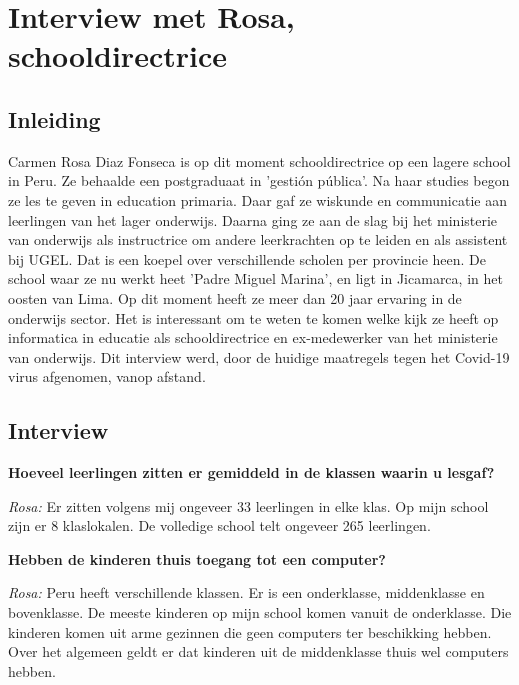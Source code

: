 
\chapter{Interview met Rosa, schooldirectrice}
\label{ch:interviewRosa}

\section{Inleiding}
Carmen Rosa Diaz Fonseca is op dit moment schooldirectrice op een lagere school in Peru. Ze behaalde een postgraduaat in 'gestión pública'. Na haar studies begon ze les te geven in education primaria. Daar gaf ze wiskunde en communicatie aan leerlingen van het lager onderwijs. Daarna ging ze aan de slag bij het ministerie van onderwijs als instructrice om andere leerkrachten op te leiden en als assistent bij UGEL. Dat is een koepel over verschillende scholen per provincie heen. De school waar ze nu werkt heet 'Padre Miguel Marina', en ligt in Jicamarca, in het oosten van Lima. Op dit moment heeft ze meer dan 20 jaar ervaring in de onderwijs sector. Het is interessant om te weten te komen welke kijk ze heeft op informatica in educatie als schooldirectrice en ex-medewerker van het ministerie van onderwijs. Dit interview werd, door de huidige maatregels tegen het Covid-19 virus afgenomen, vanop afstand.

\section{Interview}

\textbf{Hoeveel leerlingen zitten er gemiddeld in de klassen waarin u lesgaf?}

\textit{Rosa:} Er zitten volgens mij ongeveer 33 leerlingen in elke klas. Op mijn school zijn er 8 klaslokalen. De volledige school telt ongeveer 265 leerlingen.

\textbf{Hebben de kinderen thuis toegang tot een computer?}

\textit{Rosa:} Peru heeft verschillende klassen. Er is een onderklasse, middenklasse en bovenklasse. De meeste kinderen op mijn school komen vanuit de onderklasse. Die kinderen komen uit arme gezinnen die geen computers ter beschikking hebben. Over het algemeen geldt er dat kinderen uit de middenklasse thuis wel computers hebben.

